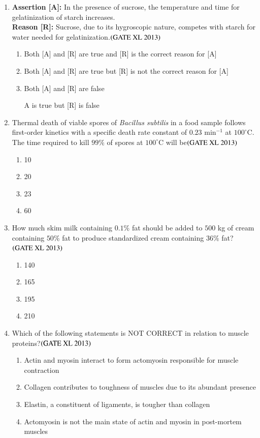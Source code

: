 \documentclass[journal]{IEEEtran}
\begin{document}
\begin{enumerate}
\item 
\textbf{Assertion [A]:} In the presence of sucrose, the temperature and time for gelatinization of starch increases.\\
\textbf{Reason [R]:} Sucrose, due to its hygroscopic nature, competes with starch for water needed for gelatinization.\hfill $\left(\text{GATE XL 2013}\right)$
\begin{enumerate}
    \item Both [A] and [R] are true and [R] is the correct reason for [A]
    \item Both [A] and [R] are true but [R] is not the correct reason for [A]
    \item Both [A] and [R] are false
    \item [A] is true but [R] is false
\end{enumerate}

\item Thermal death of viable spores of \textit{Bacillus subtilis} in a food sample follows first-order kinetics with a specific death rate constant of $0.23$ min$^{-1}$ at $100^{\circ}$C. The time  required to kill $99\%$ of spores at $100^{\circ}$C will be\hfill $\left(\text{GATE XL 2013}\right)$
\begin{enumerate}
    \item 10
    \item 20
    \item 23
    \item 60
\end{enumerate}

\item How much skim milk  containing $0.1\%$ fat should be added to $500$ kg of cream containing $50\%$ fat to produce standardized cream containing $36\%$ fat?\hfill $\left(\text{GATE XL 2013}\right)$
\begin{enumerate}
    \item 140
    \item 165
    \item 195
    \item 210
\end{enumerate}

\item Which of the following statements is NOT CORRECT in relation to muscle proteins?\hfill $\left(\text{GATE XL 2013}\right)$
\begin{enumerate}
    \item Actin and myosin interact to form actomyosin responsible for muscle contraction
    \item Collagen contributes to toughness of muscles due to its abundant presence
    \item Elastin, a constituent of ligaments, is tougher than collagen
    \item Actomyosin is not the main state of actin and myosin in post-mortem muscles
\end{enumerate}


\end{enumerate}
\end{document}
